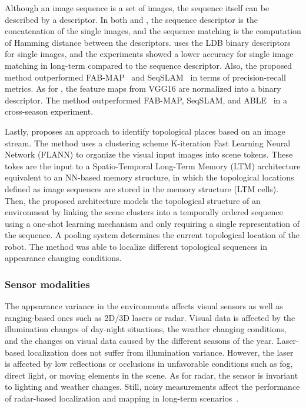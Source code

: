 Although an image sequence is a set of images, the sequence itself can be described by a descriptor. In both \cite{arroyo-et-al:2018:7} and \cite{zhu-et-al:2018:8500686}, the sequence descriptor is the concatenation of the single images, and the sequence matching is the computation of Hamming distance between the descriptors. \cite{arroyo-et-al:2018:7} uses the LDB binary descriptors for single images, and the experiments showed a lower accuracy for single image matching in long-term compared to the sequence descriptor. Also, the proposed method outperformed FAB-MAP~\parencite{discussion:fab-map} and SeqSLAM~\parencite{discussion:seqslam} in terms of precision-recall metrics.
As for \cite{zhu-et-al:2018:8500686}, the feature maps from VGG16 are normalized into a binary descriptor. The method outperformed FAB-MAP, SeqSLAM, and ABLE~\parencite{arroyo-et-al:2018:7} in a cross-season experiment.

Lastly, \cite{nguyen-et-al:2013:004} proposes an approach to identify topological places based on an image stream. 
The method uses a clustering scheme K-iteration Fast Learning Neural Network (FLANN) to organize the visual input images into scene tokens. These tokes are the input to a Spatio-Temporal Long-Term Memory (LTM) architecture equivalent to an NN-based memory structure, in which the topological locations defined as image sequences are stored in the memory structure (LTM cells). Then, the proposed architecture models the topological structure of an environment by linking the scene clusters into a temporally ordered sequence using a one-shot learning mechanism and only requiring a single representation of the sequence.
A pooling system determines the current topological location of the robot.
The method was able to localize different topological sequences in appearance changing conditions.



\subsubsection{Sensor modalities}

The appearance variance in the environments affects visual sensors as well as ranging-based ones such as 2D/3D lasers or radar. Visual data is affected by the illumination changes of day-night situations, the weather changing conditions, and the changes on visual data caused by the different seasons of the year. Laser-based localization does not suffer from illumination variance. However, the laser is affected by low reflections or occlusions  in unfavorable conditions such as fog, direct light, or moving elements in the scene. As for radar, the sensor is invariant to lighting and weather changes. Still, noisy measurements affect the performance of radar-based localization and mapping in long-term scenarios~\parencite{yin-et-al:2021:661199}.

